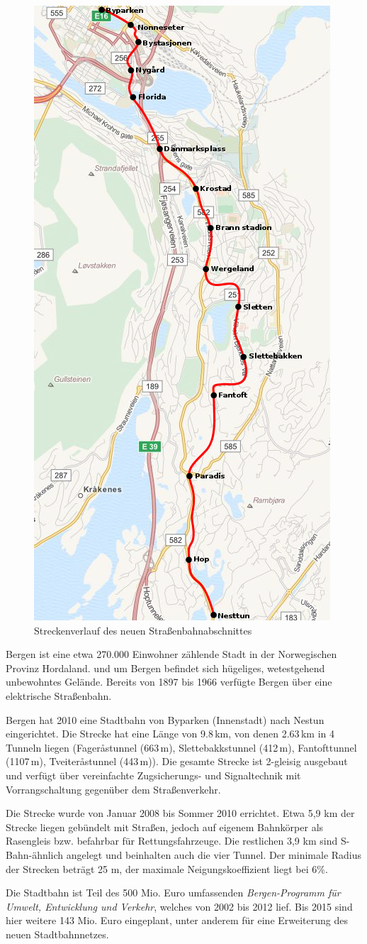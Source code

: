 \begin{figure}
  \includegraphics[width=.4\textwidth]{maps/Bergen_Karte.png}
  \caption{Streckenverlauf des neuen Straßenbahnabschnittes}
\end{figure}

Bergen ist eine etwa 270.000 Einwohner zählende Stadt in der Norwegischen
Provinz Hordaland.  und um Bergen befindet sich hügeliges, wetestgehend
unbewohntes Gelände. Bereits von 1897 bis 1966 verfügte Bergen über eine
elektrische Straßenbahn.

Bergen hat 2010 eine Stadtbahn von Byparken (Innenstadt) nach Nestun
eingerichtet. Die Strecke hat eine Länge von 9.8\,km, von denen 2.63\,km in 4
Tunneln liegen (Fageråstunnel (663\,m), Slettebakkstunnel (412\,m), Fantofttunnel
(1107\,m), Tveiteråstunnel (443\,m)). Die gesamte Strecke ist 2-gleisig ausgebaut
und verfügt über vereinfachte Zugsicherungs- und Signaltechnik mit
Vorrangschaltung gegenüber dem Straßenverkehr.

Die Strecke wurde von Januar 2008 bis Sommer 2010 errichtet. Etwa 5,9 km der
Strecke liegen gebündelt mit Straßen, jedoch auf eigenem Bahnkörper als
Rasengleis bzw. befahrbar für Rettungsfahrzeuge. Die restlichen 3,9 km sind
S-Bahn-ähnlich angelegt und beinhalten auch die vier Tunnel. Der minimale Radius
der Strecken beträgt 25 m, der maximale Neigungskoeffizient liegt bei 6\%.

Die Stadtbahn ist Teil des 500 Mio. Euro umfassenden \emph{Bergen-Programm für
Umwelt, Entwicklung und Verkehr}, welches von 2002 bis 2012 lief. Bis 2015 sind
hier weitere 143 Mio. Euro eingeplant, unter anderem für eine Erweiterung des
neuen Stadtbahnnetzes.

